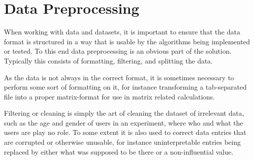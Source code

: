 \section{Data Preprocessing}
When working with data and datasets, it is important to ensure that the data format is structured in a way that is usable by the algorithms being implemented or tested. To this end data preprocessing is an obvious part of the solution. Typically this consists of formatting, filtering, and splitting the data.

As the data is not always in the correct format, it is sometimes necessary to perform some sort of formatting on it, for instance transforming a tab-separated file into a proper matrix-format for use in matrix related calculations.

Filtering or cleaning is simply the art of cleaning the dataset of irrelevant data, such as the age and gender of users in an experiment, where who and what the users are play no role. To some extent it is also used to correct data entries that are corrupted or otherwise unusable, for instance uninterpretable entries being replaced by either what was supposed to be there or a non-influential value.

